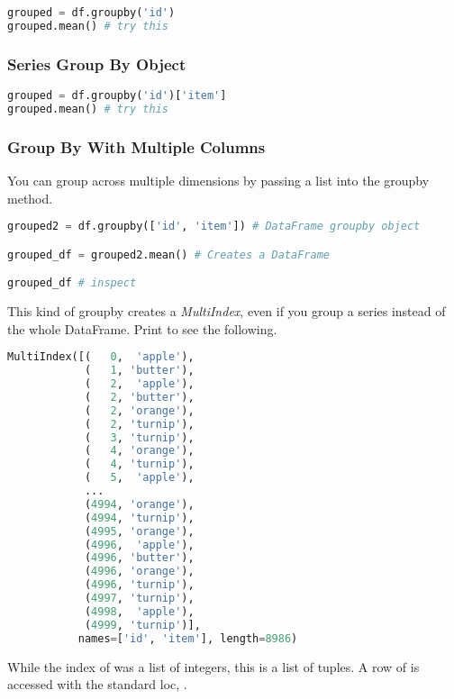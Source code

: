 \begin{lstlisting}[language = Python]
grouped = df.groupby('id')
grouped.mean() # try this
\end{lstlisting}

\subsubsection{Series Group By Object}

\begin{lstlisting}[language = Python]
grouped = df.groupby('id')['item']
grouped.mean() # try this
\end{lstlisting}


\subsubsection{Group By With Multiple Columns}

You can group across multiple dimensions by passing a list into the groupby method. 

\begin{lstlisting}[language = Python]
grouped2 = df.groupby(['id', 'item']) # DataFrame groupby object

grouped_df = grouped2.mean() # Creates a DataFrame

grouped_df # inspect
\end{lstlisting}

This kind of groupby creates a \emph{MultiIndex}, even if you group a series instead of the whole DataFrame. Print  to see the following. 

\begin{lstlisting}[language = Python]
MultiIndex([(   0,  'apple'),
            (   1, 'butter'),
            (   2,  'apple'),
            (   2, 'butter'),
            (   2, 'orange'),
            (   2, 'turnip'),
            (   3, 'turnip'),
            (   4, 'orange'),
            (   4, 'turnip'),
            (   5,  'apple'),
            ...
            (4994, 'orange'),
            (4994, 'turnip'),
            (4995, 'orange'),
            (4996,  'apple'),
            (4996, 'butter'),
            (4996, 'orange'),
            (4996, 'turnip'),
            (4997, 'turnip'),
            (4998,  'apple'),
            (4999, 'turnip')],
           names=['id', 'item'], length=8986)
\end{lstlisting}

While the index of  was a list of integers, this is a list of tuples. A row of  is accessed with the standard loc, .


